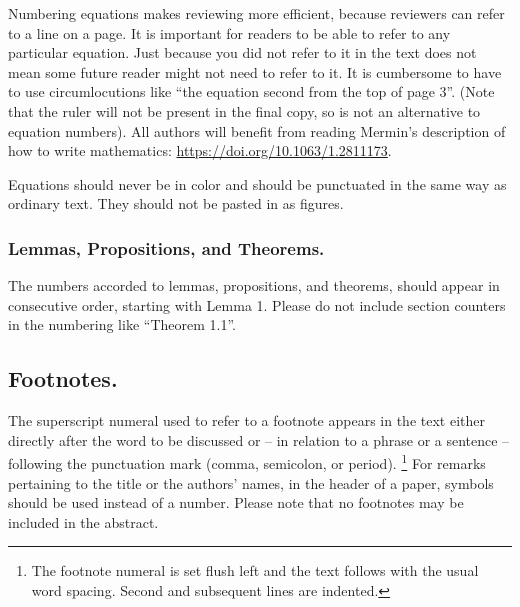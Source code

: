 \documentclass[runningheads]{llncs}
\begin{document}
Numbering equations makes reviewing more efficient, because reviewers can refer to a line on a page.  
It is important for readers to be able to refer to any particular equation.
Just because you did not refer to it in the text does not mean some future reader might not need to refer to it.
It is cumbersome to have to use circumlocutions like ``the equation second from the top of page 3''.
(Note that the ruler will not be present in the final copy, so is not an alternative to equation numbers).
All authors will benefit from reading Mermin's description of how to write mathematics:
\url{https://doi.org/10.1063/1.2811173}.

Equations should never be in color and should be punctuated in the same way as ordinary text.
They should not be pasted in as figures.


\subsubsection{Lemmas, Propositions, and Theorems.}
The numbers accorded to lemmas, propositions, and theorems, \etc should appear in consecutive order, starting with Lemma 1. 
Please do not include section counters in the numbering like ``Theorem 1.1''.


\subsection{Footnotes.}
The superscript numeral used to refer to a footnote appears in the text either directly after the word to be discussed or -- in relation to a phrase or a sentence -- following the punctuation mark (comma, semicolon, or period).%
\footnote{The footnote numeral is set flush left and the text follows with the usual word spacing. 
  Second and subsequent lines are indented. 
}
For remarks pertaining to the title or the authors' names, in the header of a paper, symbols should be used instead of a number.
Please note that no footnotes may be included in the abstract.
\end{document}
